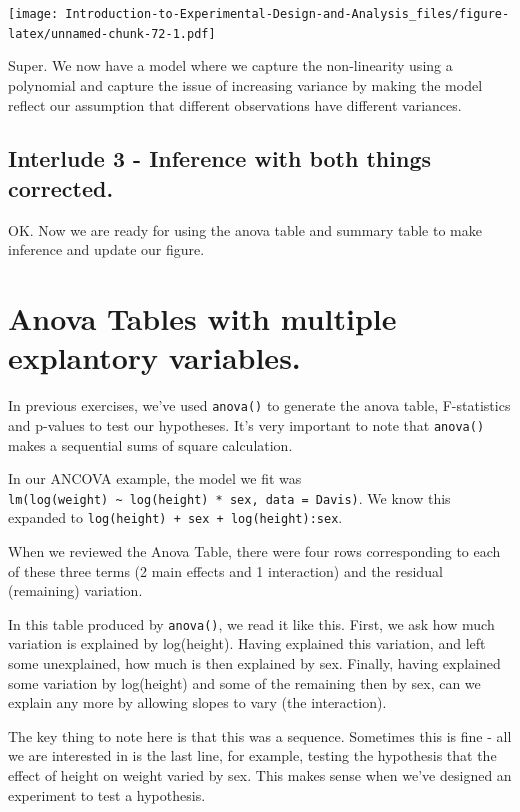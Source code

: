 \documentclass[
]{book}
\begin{document}
\texttt{[image: Introduction-to-Experimental-Design-and-Analysis\_files/figure-latex/unnamed-chunk-72-1.pdf]}

Super. We now have a model where we capture the non-linearity using a polynomial and capture the issue of increasing variance by making the model reflect our assumption that different observations have different variances.

\hypertarget{interlude-3---inference-with-both-things-corrected.}{%
\subsection{Interlude 3 - Inference with both things corrected.}\label{interlude-3---inference-with-both-things-corrected.}}

OK. Now we are ready for using the anova table and summary table to make inference and update our figure.

\hypertarget{anova-tables-with-multiple-explantory-variables.}{%
\section{Anova Tables with multiple explantory variables.}\label{anova-tables-with-multiple-explantory-variables.}}

In previous exercises, we've used \texttt{anova()} to generate the anova table, F-statistics and p-values to test our hypotheses. It's very important to note that \texttt{anova()} makes a sequential sums of square calculation.

In our ANCOVA example, the model we fit was \texttt{lm(log(weight)\ \textasciitilde{}\ log(height)\ *\ sex,\ data\ =\ Davis)}. We know this expanded to \texttt{log(height)\ +\ sex\ +\ log(height):sex}.

When we reviewed the Anova Table, there were four rows corresponding to each of these three terms (2 main effects and 1 interaction) and the residual (remaining) variation.

In this table produced by \texttt{anova()}, we read it like this. First, we ask how much variation is explained by log(height). Having explained this variation, and left some unexplained, how much is then explained by sex. Finally, having explained some variation by log(height) and some of the remaining then by sex, can we explain any more by allowing slopes to vary (the interaction).

The key thing to note here is that this was a sequence. Sometimes this is fine - all we are interested in is the last line, for example, testing the hypothesis that the effect of height on weight varied by sex. This makes sense when we've designed an experiment to test a hypothesis.
\end{document}
